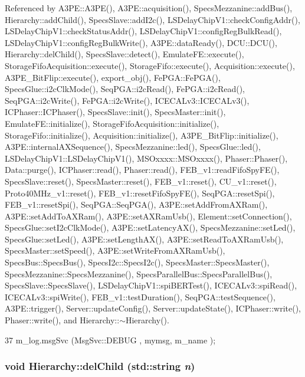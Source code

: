 Referenced by A3PE::A3PE(), A3PE::acquisition(), SpecsMezzanine::addBus(), Hierarchy::addChild(), SpecsSlave::addI2c(), LSDelayChipV1::checkConfigAddr(), LSDelayChipV1::checkStatusAddr(), LSDelayChipV1::configRegBulkRead(), LSDelayChipV1::configRegBulkWrite(), A3PE::dataReady(), DCU::DCU(), Hierarchy::delChild(), SpecsSlave::detect(), EmulateFE::execute(), StorageFifoAcquisition::execute(), StorageFifo::execute(), Acquisition::execute(), A3PE\_\-BitFlip::execute(), export\_\-obj(), FePGA::FePGA(), SpecsGlue::i2cClkMode(), SeqPGA::i2cRead(), FePGA::i2cRead(), SeqPGA::i2cWrite(), FePGA::i2cWrite(), ICECALv3::ICECALv3(), ICPhaser::ICPhaser(), SpecsSlave::init(), SpecsMaster::init(), EmulateFE::initialize(), StorageFifoAcquisition::initialize(), StorageFifo::initialize(), Acquisition::initialize(), A3PE\_\-BitFlip::initialize(), A3PE::internalAXSequence(), SpecsMezzanine::led(), SpecsGlue::led(), LSDelayChipV1::LSDelayChipV1(), MSOxxxx::MSOxxxx(), Phaser::Phaser(), Data::purge(), ICPhaser::read(), Phaser::read(), FEB\_\-v1::readFifoSpyFE(), SpecsSlave::reset(), SpecsMaster::reset(), FEB\_\-v1::reset(), CU\_\-v1::reset(), Proto40MHz\_\-v1::reset(), FEB\_\-v1::resetFifoSpyFE(), SeqPGA::resetSpi(), FEB\_\-v1::resetSpi(), SeqPGA::SeqPGA(), A3PE::setAddFromAXRam(), A3PE::setAddToAXRam(), A3PE::setAXRamUsb(), Element::setConnection(), SpecsGlue::setI2cClkMode(), A3PE::setLatencyAX(), SpecsMezzanine::setLed(), SpecsGlue::setLed(), A3PE::setLengthAX(), A3PE::setReadToAXRamUsb(), SpecsMaster::setSpeed(), A3PE::setWriteFromAXRamUsb(), SpecsBus::SpecsBus(), SpecsI2c::SpecsI2c(), SpecsMaster::SpecsMaster(), SpecsMezzanine::SpecsMezzanine(), SpecsParallelBus::SpecsParallelBus(), SpecsSlave::SpecsSlave(), LSDelayChipV1::spiBERTest(), ICECALv3::spiRead(), ICECALv3::spiWrite(), FEB\_\-v1::testDuration(), SeqPGA::testSequence(), A3PE::trigger(), Server::updateConfig(), Server::updateState(), ICPhaser::write(), Phaser::write(), and Hierarchy::$\sim$Hierarchy().


\begin{DoxyCode}
37 { m_log.msgSvc (MsgSvc::DEBUG   , mymsg, m_name ); }
\end{DoxyCode}
\hypertarget{classHierarchy_a1928ac7615fe0b5e55cd707f70dc6781}{
\subsubsection[{delChild}]{\setlength{\rightskip}{0pt plus 5cm}void Hierarchy::delChild (std::string {\em n})}}
\label{classHierarchy_a1928ac7615fe0b5e55cd707f70dc6781}


